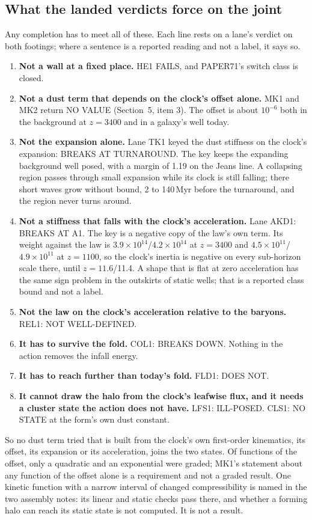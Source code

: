 \documentclass[10pt]{article}
\begin{document}
\subsection{What the landed verdicts force on the joint}
Any completion has to meet all of these. Each line rests on a lane's verdict on both footings; where a sentence is a reported reading and not a label, it says so.
\begin{enumerate}
\item \textbf{Not a wall at a fixed place.} HE1 FAILS, and PAPER71's switch class is closed.
\item \textbf{Not a dust term that depends on the clock's offset alone.} MK1 and MK2 return NO VALUE (Section~5, item 3). The offset is about $10^{-6}$ both in the background at $z=3400$ and in a galaxy's well today.
\item \textbf{Not the expansion alone.} Lane TK1 keyed the dust stiffness on the clock's expansion: BREAKS AT TURNAROUND. The key keeps the expanding background well posed, with a margin of 1.19 on the Jeans line. A collapsing region passes through small expansion while its clock is still falling; there short waves grow without bound, 2 to 140\,Myr before the turnaround, and the region never turns around.
\item \textbf{Not a stiffness that falls with the clock's acceleration.} Lane AKD1: BREAKS AT A1. The key is a negative copy of the law's own term. Its weight against the law is $3.9\times10^{14}$/$4.2\times10^{14}$ at $z=3400$ and $4.5\times10^{11}$/$4.9\times10^{11}$ at $z=1100$, so the clock's inertia is negative on every sub-horizon scale there, until $z=11.6$/11.4. A shape that is flat at zero acceleration has the same sign problem in the outskirts of static wells; that is a reported class bound and not a label.
\item \textbf{Not the law on the clock's acceleration relative to the baryons.} REL1: NOT WELL-DEFINED.
\item \textbf{It has to survive the fold.} COL1: BREAKS DOWN. Nothing in the action removes the infall energy.
\item \textbf{It has to reach further than today's fold.} FLD1: DOES NOT.
\item \textbf{It cannot draw the halo from the clock's leafwise flux, and it needs a cluster state the action does not have.} LFS1: ILL-POSED. CLS1: NO STATE at the form's own dust constant.
\end{enumerate}
So no dust term tried that is built from the clock's own first-order kinematics, its offset, its expansion or its acceleration, joins the two states. Of functions of the offset, only a quadratic and an exponential were graded; MK1's statement about any function of the offset alone is a requirement and not a graded result. One kinetic function with a narrow interval of changed compressibility is named in the two assembly notes: its linear and static checks pass there, and whether a forming halo can reach its static state is not computed. It is not a result.
\end{document}
